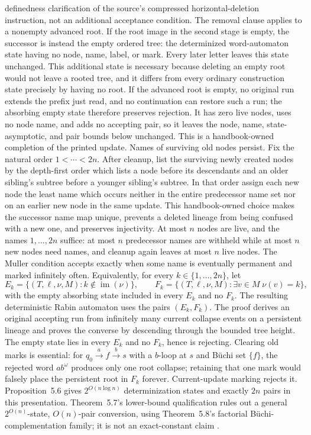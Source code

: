 definedness clarification of the source's compressed horizontal-deletion
instruction, not an additional acceptance condition.
The removal clause applies to a nonempty advanced root.  If the root image in
the second stage is empty, the successor is instead the empty ordered tree:
the determinized word-automaton state having no node, name, label, or mark.
Every later letter leaves this state unchanged.  This additional state is
necessary because deleting an empty root would not leave a rooted tree, and it
differs from every ordinary construction state precisely by having no root.  If
the advanced root is empty, no original run extends the prefix just read, and
no continuation can restore such a run; the absorbing empty state therefore
preserves rejection.  It has zero live nodes, uses no node name, and adds no
accepting pair, so it leaves the node, name, state-asymptotic, and pair bounds
below unchanged.  This is a handbook-owned completion of the printed update.
Names of surviving old nodes persist.  Fix the natural order
\(1<\cdots<2n\).  After cleanup, list the surviving newly created nodes by the
depth-first order which lists a node before its descendants and an older
sibling's subtree before a younger sibling's subtree.  In that order assign
each new node the least name which occurs neither in the entire predecessor
name set nor on an earlier new node in the same update.  This handbook-owned
choice makes the successor name map unique, prevents a deleted lineage from
being confused with a new one, and preserves injectivity.  At most \(n\) nodes
are live, and the names \(1,\ldots,2n\) suffice: at most \(n\) predecessor
names are withheld while at most \(n\) new nodes need names, and cleanup again
leaves at most \(n\) live nodes.  The Muller condition accepts exactly when some name is
eventually permanent and marked infinitely often.  Equivalently, for every
\(k\in\{1,\ldots,2n\}\), let
\[
 E_k=\{(T,\ell,\nu,M):k\notin\operatorname{im}(\nu)\},
 \qquad
 F_k=\{(T,\ell,\nu,M):\exists v\in M\;\nu(v)=k\},
\]
with the empty absorbing state included in every \(E_k\) and no \(F_k\).  The
resulting deterministic Rabin automaton uses the pairs \((E_k,F_k)\).  The
proof derives an original accepting
run from infinitely many current collapse events on a persistent lineage and
proves the converse by descending through the bounded tree height.  The empty
state lies in every \(E_k\) and no \(F_k\), hence is rejecting.  Clearing old
marks is essential: for
\(q_0\mathrel{\xrightarrow{a}}f\mathrel{\xrightarrow{b}}s\) with a
\(b\)-loop at \(s\) and B\"uchi set \(\{f\}\), the rejected word
\(ab^\omega\) produces only one root collapse; retaining that one mark would
falsely place the persistent root in \(F_k\) forever.  Current-update marking
rejects it.  Proposition~5.6 gives
\(2^{O(n\log n)}\) determinization states and exactly \(2n\) pairs in this
presentation.  Theorem~5.7's lower-bound qualification rules out a general
\(2^{O(n)}\)-state, \(O(n)\)-pair conversion, using Theorem~5.8's factorial
B\"uchi-complementation family; it is not an exact-constant claim
\cite[\S5.2]{Thomas1996Report}.

